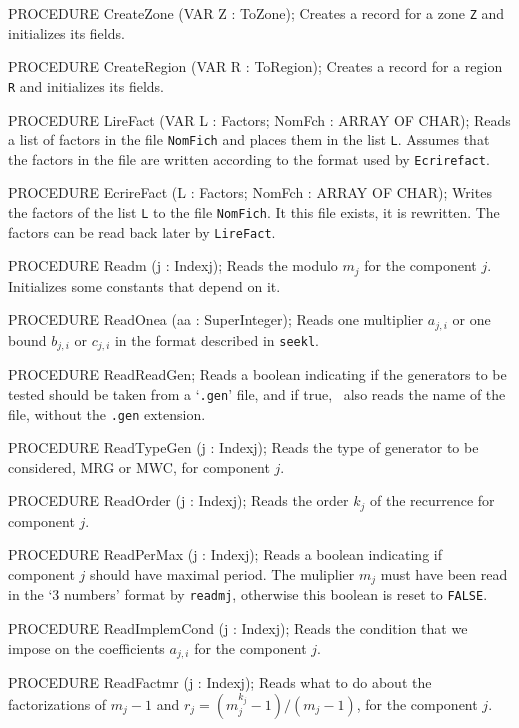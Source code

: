 PROCEDURE CreateZone (VAR Z : ToZone);
\endcode
 \tab 
  Creates a record for a zone {\tt Z} and initializes its  fields.
 \endtab
\code

PROCEDURE CreateRegion (VAR R : ToRegion);
\endcode
 \tab 
  Creates a record for a region {\tt R} and initializes its  fields.
 \endtab
\code

PROCEDURE LireFact (VAR L : Factors;   NomFch : ARRAY OF CHAR);
\endcode
 \tab
  Reads a list of factors in the file {\tt NomFich} and places them
  in the list {\tt L}.  Assumes that the factors in the file are
  written according to the format used by {\tt Ecrirefact}.
 \endtab
\code

PROCEDURE EcrireFact (L : Factors;   NomFch : ARRAY OF CHAR);
\endcode
 \tab
  Writes the factors of the list {\tt L} to the file {\tt NomFich}.
  It this file exists, it is rewritten.
  The factors can be read back later by {\tt LireFact}.
 \endtab
\code

PROCEDURE Readm (j : Indexj);
\endcode
 \tab
  Reads the modulo $m_j$ for the component $j$.
  Initializes some constants that depend on it.
 \endtab
\code

PROCEDURE ReadOnea (aa : SuperInteger);
\endcode
 \tab
  Reads one multiplier $a_{j,i}$ or one bound 
  $b_{j,i}$ or $c_{j,i}$ in the format described in {\tt seekl}.
 \endtab
\code

PROCEDURE ReadReadGen;
\endcode
 \tab
  Reads a boolean indicating if the generators to be tested should be
  taken from a `{\tt .gen}' file, and if true, \
  also reads the name of the file, without the {\tt .gen} extension.
 \endtab
\code

PROCEDURE ReadTypeGen (j : Indexj);
\endcode
 \tab
  Reads the type of generator to be considered, MRG or MWC,
  for component $j$.
 \endtab
\code

PROCEDURE ReadOrder (j : Indexj);
\endcode
 \tab
  Reads the order $k_j$ of the recurrence  for component $j$.
 \endtab
\code

PROCEDURE ReadPerMax (j : Indexj);
\endcode
 \tab
  Reads a boolean indicating if component $j$ should have 
  maximal period.  The muliplier $m_j$ must have been read in
  the `3 numbers' format by {\tt readmj}, otherwise this boolean
  is reset to {\tt FALSE}.
 \endtab
\code

PROCEDURE ReadImplemCond (j : Indexj);
\endcode
 \tab
  Reads the condition that we impose on the coefficients $a_{j,i}$
  for the component $j$.  
 \endtab
\code

PROCEDURE ReadFactmr (j : Indexj);
\endcode
 \tab
  Reads what to do about the factorizations of $m_j-1$ and 
  $r_j = (m_j^{k_j}-1)/(m_j-1)$,  for the component $j$.
 \endtab
\code

